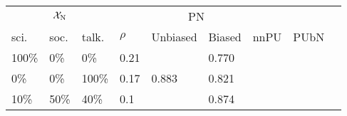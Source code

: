 \begin{tabular}{@{}lllllllll@{}}
  \toprule
  \multicolumn{3}{c}{$\mathcal{X}_{\textnormal{N}}$} &          & \multicolumn{2}{c}{PN} &       &      \\\cmidrule{1-3}\cmidrule{5-6}
  sci.   & soc.   & talk.       & $\rho$   & Unbiased               & Biased      & nnPU  & PUbN \\\midrule\cline{5-5}
  100\%  & 0\%    & 0\%         & 0.21     & \multicolumn{1}{|l|}{\multirow{3}{*}{0.883}} & 0.770 \\
  0\%    & 0\%    & 100\%       & 0.17     & \multicolumn{1}{|l|}{} & 0.821 \\
  10\%   & 50\%   & 40\%        & 0.1      & \multicolumn{1}{|l|}{} & 0.874 \\\cline{5-5}
  \bottomrule
\end{tabular}
